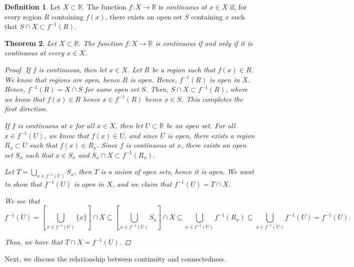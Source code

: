 \documentclass[11pt]{article}
\newcommand{\bbR}{\mathbb{R}}
\renewcommand{\_}[1]{\underline{ #1 }}
\newtheorem{theorem}{Theorem}[section]
\theoremstyle{definition}
\newtheorem{definition}[theorem]{Definition}
\numberwithin{equation}{subsection}
\begin{document}
\begin{definition}
Let $X\subset \bbR.$  The function $f\colon X\to \bbR$ is {\em continuous at $x\in X$} if, 
for every region $R$  containing $f(x)$, there exists an open set $S$ containing $x$ such that $S\cap X\subset f^{-1}( R)$.
\end{definition}

\begin{theorem}\label{reformulation}
Let $X\subset \bbR.$ The function $f\colon X\to \bbR$ is continuous if and only if it is continuous at every $x\in X$.

\begin{proof}
If $f$ is continuous, then let $x \in X$. Let $R$ be a region such that $f(x) \in R$. We know that regions are open, hence $R$ is open. Hence, $f^{-1}(R)$ is open in $X$. Hence, $f^{-1}(R)=X \cap S$ for some open set $S$. Then, $S \cap X \subset f^{-1}(R)$, where we know that $f(x) \in R$ hence $x \in f^{-1}(R)$ hence $x \in S$. This completes the first direction.

If $f$ is continuous at $x$ for all $x \in X$, then let $U \subset \bbR$ be an open set. For all $x \in f^{-1}(U)$, we know that $f(x) \in U$, and since $U$ is open, there exists a region $R_x \subset U$ such that $f(x) \in R_x$. Since $f$ is continuous at $x$, there exists an open set $S_x$ such that $x \in S_x$ and $S_x \cap X \subset f^{-1}(R_x)$. 

Let $T = \bigcup_{x\in f^{-1}(U)} S_x$, then $T$ is a union of open sets, hence it is open. We want to show that $f^{-1}(U)$ is open in $X$, and we claim that $f^{-1}(U)=T \cap X$. 

We see that
\[
f^{-1}(U)=[\bigcup_{x \in f^{-1}(U)} \{x\}] \cap X \subseteq [\bigcup_{x \in f^{-1}(U)} S_x]\cap X \subseteq \bigcup_{x \in f^{-1}(U)} f^{-1}(R_x) \subseteq \bigcup_{x \in f^{-1}(U)} f^{-1}(U) = f^{-1}(U).
\]

Thus, we have that $T \cap X = f^{-1}(U)$.



\renewcommand\qedsymbol{QED}
\end{proof}


\end{theorem}

Next, we discuss the relationship between continuity and connectedness. 
\end{document}
